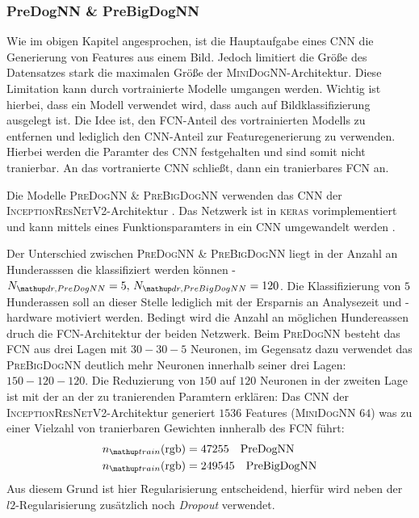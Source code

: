 \subsubsection{PreDogNN \& PreBigDogNN}
Wie im obigen Kapitel angesprochen, ist die Hauptaufgabe eines CNN die Generierung
von Features aus einem Bild. Jedoch limitiert die Größe des Datensatzes stark
die maximalen Größe der \textsc{MiniDogNN}-Architektur. Diese Limitation
kann durch vortrainierte Modelle umgangen werden. Wichtig ist hierbei, dass
ein Modell verwendet wird, dass auch auf Bildklassifizierung ausgelegt ist.
Die Idee ist, den FCN-Anteil des vortrainierten Modells zu entfernen und lediglich den CNN-Anteil
zur Featuregenerierung zu verwenden. Hierbei werden die Paramter des CNN
festgehalten und sind somit nicht tranierbar. An das vortranierte CNN schließt, dann
ein tranierbares FCN an.

Die Modelle \textsc{PreDogNN \& PreBigDogNN} verwenden das CNN der
\textsc{InceptionResNetV2}-Architektur \cite{InceptionResNetV2}. Das Netzwerk
ist in \textsc{keras} vorimplementiert und kann mittels eines Funktionsparamters
in ein CNN umgewandelt werden \cite{keras_InceptionResNetV2}.

Der Unterschied zwischen \textsc{PreDogNN \& PreBigDogNN} liegt in der Anzahl
an Hunderasssen die klassifiziert werden können -
$N\ua{dr, PreDogNN}=5,\, N\ua{dr, PreBigDogNN}=120$. Die Klassifizierung von $5$ Hunderassen
soll an dieser Stelle lediglich mit der Ersparnis an Analysezeit und -hardware
motiviert werden. Bedingt wird die Anzahl an möglichen Hundereassen druch die
FCN-Architektur der beiden Netzwerk. Beim \textsc{PreDogNN} besteht das FCN aus
drei Lagen mit $30-30-5$ Neuronen, im Gegensatz dazu verwendet das \textsc{PreBigDogNN} deutlich
mehr Neuronen innerhalb seiner drei Lagen: $150-120-120$. Die Reduzierung von
$150$ auf $120$ Neuronen in der zweiten Lage ist mit der an der zu tranierenden Paramtern
erklären: Das CNN der \textsc{InceptionResNetV2}-Architektur generiert
$1536$ Features (\textsc{MiniDogNN} $64$) was zu einer Vielzahl von
tranierbaren Gewichten innheralb des FCN führt:
\begin{align}
  \begin{aligned}
  \label{eq:ntrain_PreDogNN_PreBigDogNN}
  n\ua{train}(\mathrm{rgb}) &= 47255 \quad \mathrm{PreDogNN} \\
  n\ua{train}(\mathrm{rgb}) &= 249545 \quad \mathrm{PreBigDogNN}
\end{aligned}
\end{align}
Aus diesem Grund ist hier Regularisierung entscheidend, hierfür wird neben der
$l2$-Regularisierung zusätzlich noch \emph{Dropout} verwendet.

